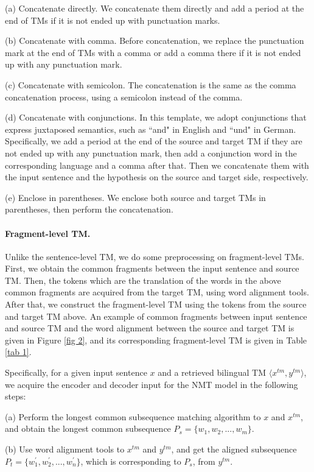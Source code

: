 \documentclass[letterpaper]{article} %
\begin{document}
(a) Concatenate directly. We concatenate them directly and add a period at the end of TMs if it is not ended up with punctuation marks.

(b) Concatenate with comma. Before concatenation, we replace the punctuation mark at the end of TMs with a comma or add a comma there if it is not ended up with any punctuation mark.

(c) Concatenate with semicolon. The concatenation is the same as the comma concatenation process, using a semicolon instead of the comma.

(d) Concatenate with conjunctions. In this template, we adopt conjunctions that express juxtaposed semantics, such as ``and" in English and ``und" in German. Specifically, we add a period at the end of the source and target TM if they are not ended up with any punctuation mark, then add a conjunction word in the corresponding language and a comma after that. Then we concatenate them with the input sentence and the hypothesis on the source and target side, respectively.

(e) Enclose in parentheses. We enclose both source and target TMs in parentheses, then perform the concatenation.

\paragraph{Fragment-level TM.} Unlike the sentence-level TM, we do some preprocessing on fragment-level TMs. First, we obtain the common fragments between the input sentence and source TM. Then, the tokens which are the translation of the words in the above common fragments are acquired from the target TM, using word alignment tools. After that, we construct the fragment-level TM using the tokens from the source and target TM above. An example of common fragments between input sentence and source TM and the word alignment between the source and target TM is given in Figure \ref{fig 2}, and its corresponding fragment-level TM is given in Table \ref{tab 1}.

Specifically, for a given input sentence $x$ and a retrieved bilingual TM $\langle x^{tm},y^{tm}\rangle$, we acquire the encoder and decoder input for the NMT model in the following steps:

(a) Perform the longest common subsequence matching algorithm to $x$ and $x^{tm}$, and obtain the longest common subsequence $P_s = \{w_1,w_2,...,w_m\}$.

(b) Use word alignment tools to $x^{tm}$ and $y^{tm}$, and get the aligned subsequence $P_t = \{w^\prime_1,w^\prime_2,...,w^\prime_n\}$, which is corresponding to $P_s$, from $y^{tm}$.
\end{document}

